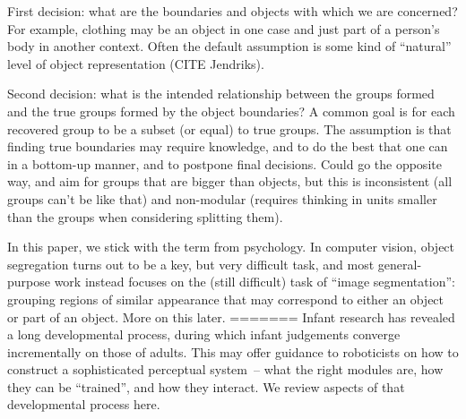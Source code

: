 First decision: what are the boundaries and objects with which
we are concerned?  For example, clothing may be an object in
one case and just part of a person's body in another context.
Often the default assumption is some kind of ``natural''
level of object representation (CITE Jendriks).

Second decision: what is the intended relationship between the groups
formed and the true groups formed by the object boundaries?  A common
goal is for each recovered group to be a subset (or equal) to
true groups.  The assumption is that finding true boundaries may
require knowledge, and to do the best that one can in a bottom-up
manner, and to postpone final decisions.  Could go the opposite way,
and aim for groups that are bigger than objects, but this is 
inconsistent (all groups can't be like that) and non-modular 
(requires thinking in units smaller than the groups when considering 
splitting them).

In this paper, we
stick with the term from psychology.  In computer vision, object
segregation turns out to be a key, but very difficult task, and most
general-purpose work instead focuses on the (still difficult) task of
``image segmentation'': grouping regions of similar appearance that
may correspond to either an object or part of an object.
%
More on this later.
%
=======
Infant research has revealed a long developmental process, during
which infant judgements converge incrementally on those of adults.
This may offer guidance to roboticists on how to construct a
sophisticated perceptual system~-- what the right modules are, how
they can be ``trained'', and how they interact.  We review aspects 
of that developmental process here.



